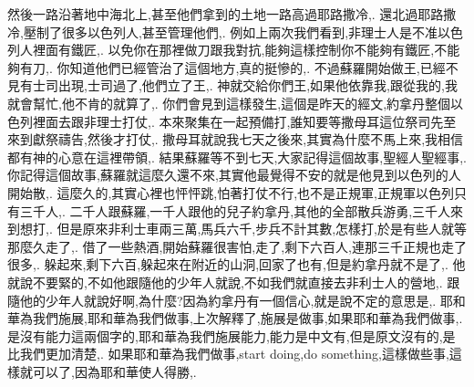\documentclass{book}
\begin{document}
然後一路沿著地中海北上,甚至他們拿到的土地一路高過耶路撒冷,.
還北過耶路撒冷,壓制了很多以色列人,甚至管理他們,.
例如上兩次我們看到,非理士人是不准以色列人裡面有鐵匠,.
以免你在那裡做刀跟我對抗,能夠這樣控制你不能夠有鐵匠,不能夠有刀,.
你知道他們已經管治了這個地方,真的挺慘的,.
不過蘇羅開始做王,已經不見有士司出現,士司過了,他們立了王,.
神就交給你們王,如果他依靠我,跟從我的,我就會幫忙,他不肯的就算了,.
你們會見到這樣發生,這個是昨天的經文,約拿丹整個以色列裡面去跟非理士打仗,.
本來聚集在一起預備打,誰知要等撒母耳這位祭司先至來到獻祭禱告,然後才打仗,.
撒母耳就說我七天之後來,其實為什麼不馬上來,我相信都有神的心意在這裡帶領,.
結果蘇羅等不到七天,大家記得這個故事,聖經人聖經事,.
你記得這個故事,蘇羅就這麼久還不來,其實他最覺得不安的就是他見到以色列的人開始散,.
這麼久的,其實心裡也怦怦跳,怕著打仗不行,也不是正規軍,正規軍以色列只有三千人,.
二千人跟蘇羅,一千人跟他的兒子約拿丹,其他的全部散兵游勇,三千人來到想打,.
但是原來非利士車兩三萬,馬兵六千,步兵不計其數,怎樣打,於是有些人就等那麼久走了,.
借了一些熱酒,開始蘇羅很害怕,走了,剩下六百人,連那三千正規也走了很多,.
躲起來,剩下六百,躲起來在附近的山洞,回家了也有,但是約拿丹就不是了,.
他就說不要緊的,不如他跟隨他的少年人就說,不如我們就直接去非利士人的營地,.
跟隨他的少年人就說好啊,為什麼?因為約拿丹有一個信心,就是說不定的意思是,.
耶和華為我們施展,耶和華為我們做事,上次解釋了,施展是做事,如果耶和華為我們做事,.
是沒有能力這兩個字的,耶和華為我們施展能力,能力是中文有,但是原文沒有的,是比我們更加清楚,.
如果耶和華為我們做事,start doing,do something,這樣做些事,這樣就可以了,因為耶和華使人得勝,.
\end{document}

